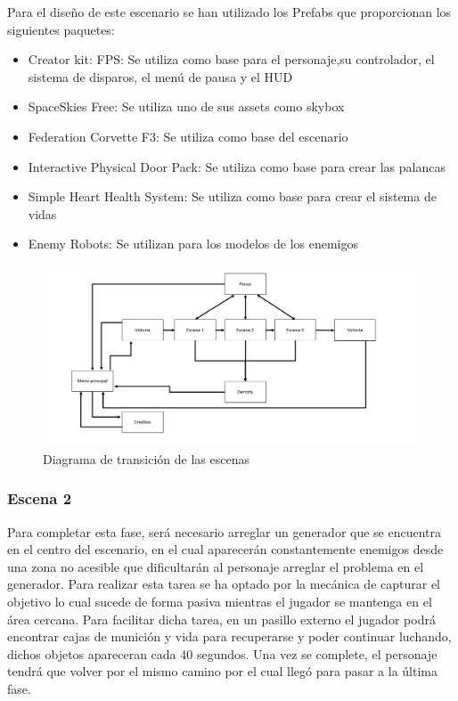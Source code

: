 Para el diseño de este escenario se han utilizado los Prefabs que proporcionan los siguientes paquetes:
\begin{itemize}
	\item Creator kit: FPS: Se utiliza como base para el personaje,su controlador, el sistema de disparos, el menú de pausa y el HUD
	\item SpaceSkies Free: Se utiliza uno de sus assets como skybox
	\item Federation Corvette F3: Se utiliza como base del escenario
	\item Interactive Physical Door Pack: Se utiliza como base para crear las palancas
	\item Simple Heart Health System: Se utiliza como base para crear el sistema de vidas
	\item Enemy Robots: Se utilizan para los modelos de los enemigos
\end{itemize}

\begin{figure}[H]
	\centering
	\includegraphics[scale=0.35]{imagenes/transicionEscenas.jpeg}
	\caption{\label{fig:TrasicionEscenas3D}Diagrama de transición de las escenas}
\end{figure}


\subsubsection{Escena 2}
Para completar esta fase, será necesario arreglar un generador que se encuentra en el centro del escenario, en el cual aparecerán constantemente enemigos desde una zona no acesible que dificultarán al personaje arreglar el problema en el generador. Para realizar esta tarea se ha optado por la mecánica de capturar el objetivo lo cual sucede de forma pasiva mientras el jugador se mantenga en el área cercana. Para facilitar dicha tarea, en un pasillo externo el jugador podrá encontrar cajas de munición y vida para recuperarse y poder continuar luchando, dichos objetos apareceran cada 40 segundos. Una vez se complete, el personaje tendrá que volver por el mismo camino por el cual llegó para pasar a la última fase.

